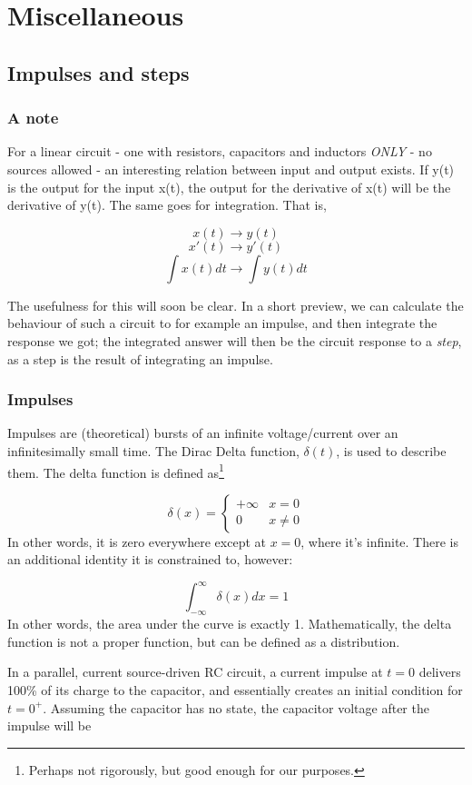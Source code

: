 \documentclass[12pt,a4paper]{report}
\begin{document}
\chapter{Miscellaneous}
\section{Impulses and steps}

\subsection{A note}
For a linear circuit - one with resistors, capacitors and inductors \emph{ONLY} - no sources allowed - an interesting relation between input and output exists. If y(t) is the output for the input x(t), the output for the derivative of x(t) will be the derivative of y(t). The same goes for integration. That is,

\[ x(t) \to y(t) \]
\[ x'(t) \to y'(t) \]
\[ \int x(t) dt \to \int y(t) dt \]

The usefulness for this will soon be clear. In a short preview, we can calculate the behaviour of such a circuit to for example an impulse, and then integrate the response we got; the integrated answer will then be the circuit response to a \emph{step}, as a step is the result of integrating an impulse.

\subsection{Impulses}
Impulses are (theoretical) bursts of an infinite voltage/current over an infinitesimally small time. The Dirac Delta function, $\delta(t)$, is used to describe them. The delta function is defined as\footnote{Perhaps not rigorously, but good enough for our purposes.}

\[ \delta(x) = \begin{cases}
   +\infty & x = 0 \\
   0       & x \neq 0
   \end{cases}
\]
In other words, it is zero everywhere except at $x = 0$, where it's infinite. There is an additional identity it is constrained to, however:

\[ \int_{-\infty}^{\infty} \delta(x) dx = 1 \]
In other words, the area under the curve is exactly 1. Mathematically, the delta function is not a proper function, but can be defined as a distribution.

In a parallel, current source-driven RC circuit, a current impulse at $t = 0$ delivers 100\% of its charge to the capacitor, and essentially creates an initial condition for $t = 0^{+}$. Assuming the capacitor has no state, the capacitor voltage after the impulse will be 
\end{document}
